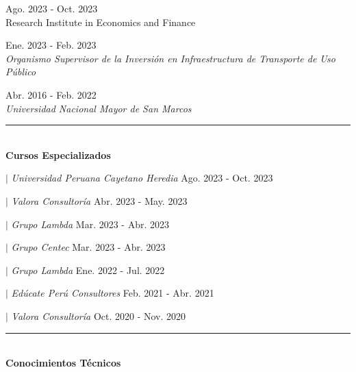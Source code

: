\documentclass{resume}
\begin{document}
 \hfill {Ago. 2023 - Oct. 2023} \\
{Research Institute in Economics and Finance}
\vspace{5pt}

 \hfill {Ene. 2023 - Feb. 2023} \\
{\it Organismo Supervisor de la Inversión en Infraestructura de Transporte de Uso Público}
\vspace{5pt}

 \hfill {Abr. 2016 - Feb. 2022} \\
{\it Universidad Nacional Mayor de San Marcos}
\vspace{5pt}


{\color{vino} \noindent \rule{\textwidth}{1pt}} \\
{\color{vino} \noindent \faBook \; {\large \bf Cursos Especializados}}
\vspace{5pt}

 $|$ {\it Universidad Peruana Cayetano Heredia} \hfill {Ago. 2023 - Oct. 2023} \par
{} $|$ {\it Valora Consultoría} \hfill {Abr. 2023 - May. 2023} \par
{} $|$ {\it Grupo Lambda} \hfill {Mar. 2023 - Abr. 2023} \par
{} $|$ {\it Grupo Centec} \hfill {Mar. 2023 - Abr. 2023} \par
{} $|$ {\it Grupo Lambda} \hfill {Ene. 2022 - Jul. 2022} \par
{} $|$ {\it Edúcate Perú Consultores} \hfill {Feb. 2021 - Abr. 2021} \par
{} $|$ {\it Valora Consultoría} \hfill {Oct. 2020 - Nov. 2020} \par
\vspace{5pt}


{\color{vino} \noindent \rule{\textwidth}{1pt}} \\
{\color{vino} \noindent \faCertificate \; {\large \bf Conocimientos Técnicos}}
\vspace{5pt}
\end{document}
